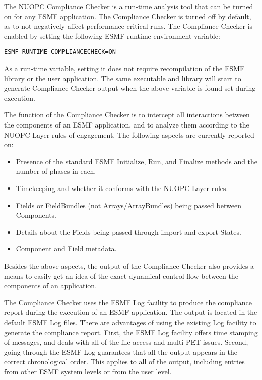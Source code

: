 %

\label{Checker}

The NUOPC Compliance Checker is a run-time analysis tool that can be turned on for any ESMF application. The Compliance Checker is turned off by default, as to not negatively affect performance critical runs. The Compliance Checker is enabled by setting the following ESMF runtime environment variable:
\begin{verbatim}
ESMF_RUNTIME_COMPLIANCECHECK=ON 
\end{verbatim}
As a run-time variable, setting it does not require recompilation of the ESMF library or the user application. The same executable and library will start to generate Compliance Checker output when the above variable is found set during execution.

The function of the Compliance Checker is to intercept all interactions between the components of an ESMF application, and to analyze them according to the NUOPC Layer rules of engagement. The following aspects are currently reported on:
\begin{itemize}
\item Presence of the standard ESMF Initialize, Run, and Finalize methods and the number of phases in each.
\item Timekeeping and whether it conforms with the NUOPC Layer rules.
\item Fields or FieldBundles (not Arrays/ArrayBundles) being passed between Components.
\item Details about the Fields being passed through import and export States. \item Component and Field metadata.
\end{itemize}

Besides the above aspects, the output of the Compliance Checker also provides a means to easily get an idea of the exact dynamical control flow between the components of an application.

The Compliance Checker uses the ESMF Log facility to produce the compliance report during the execution of an ESMF application. The output is located in the default ESMF Log files. There are advantages of using the existing Log facility to generate the compliance report. First, the ESMF Log facility offers time stamping of messages, and deals with all of the file access and multi-PET issues. Second, going through the ESMF Log guarantees that all the output appears in the correct chronological order. This applies to all of the output, including entries from other ESMF system levels or from the user level. 

